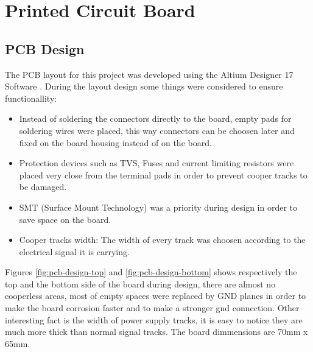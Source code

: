 \section{Printed Circuit Board}\label{sec:printed-circuit-board}

	\subsection{PCB Design}\label{ssec:pcb-design}

		The PCB layout for this project was developed using the Altium Designer 17 Software \cite{AD17}. During the layout design some things were considered to ensure functionallity:

		\begin{itemize}
			\item Instead of soldering the connectors directly to the board, empty pads for soldering wires were placed, this way connectors can be choosen later and fixed on the board housing instead of on the board.\label{itm:pcb-pin-bars}
			\item Protection devices such as TVS, Fuses and current limiting resistors were placed very close from the terminal pads in order to prevent cooper tracks to be damaged.\label{itm:pcb-protection}
			\item SMT (Surface Mount Technology) was a priority during design in order to save space on the board.\label{itm:pcb-smt}
			\item Cooper tracks width: The width of every track was choosen according to the electrical signal it is carrying.\label{itm:pcb-track}
 		\end{itemize}

 		Figures \ref{fig:pcb-design-top} and \ref{fig:pcb-design-bottom} shows respectively the top and the bottom side of the board during design, there are almost no cooperless areas, most of empty spaces were replaced by GND planes in order to make the board corrosion faster and to make a stronger gnd connection. Other interesting fact is the width of power supply tracks, it is easy to notice they are much more thick than normal signal tracks. The board dimmensions are 70mm x 65mm.

